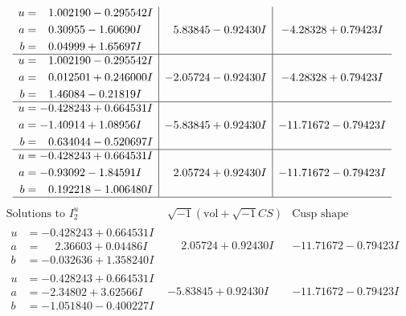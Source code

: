 \documentclass[1p]{elsarticle_modified}
\theoremstyle{definition}
\newcommand{\I}{\sqrt{-1}}
\begin{document}
$$\begin{array}{c|c|c}
\begin{aligned}
u &= \phantom{-}1.002190 - 0.295542 I \\
a &= \phantom{-}0.30955 - 1.60690 I \\
b &= \phantom{-}0.04999 + 1.65697 I\end{aligned}
 & \phantom{-}5.83845 - 0.92430 I & -4.28328 + 0.79423 I \\ \hline\begin{aligned}
u &= \phantom{-}1.002190 - 0.295542 I \\
a &= \phantom{-}0.012501 + 0.246000 I \\
b &= \phantom{-}1.46084 - 0.21819 I\end{aligned}
 & -2.05724 - 0.92430 I & -4.28328 + 0.79423 I \\ \hline\begin{aligned}
u &= -0.428243 + 0.664531 I \\
a &= -1.40914 + 1.08956 I \\
b &= \phantom{-}0.634044 - 0.520697 I\end{aligned}
 & -5.83845 + 0.92430 I & -11.71672 - 0.79423 I \\ \hline\begin{aligned}
u &= -0.428243 + 0.664531 I \\
a &= -0.93092 - 1.84591 I \\
b &= \phantom{-}0.192218 - 1.006480 I\end{aligned}
 & \phantom{-}2.05724 + 0.92430 I & -11.71672 - 0.79423 I\\
 \hline 
 \end{array}$$\newpage$$\begin{array}{c|c|c}  
\text{Solutions to }I^u_{2}& \I (\text{vol} + \sqrt{-1}CS) & \text{Cusp shape}\\
 \hline 
\begin{aligned}
u &= -0.428243 + 0.664531 I \\
a &= \phantom{-}2.36603 + 0.04486 I \\
b &= -0.032636 + 1.358240 I\end{aligned}
 & \phantom{-}2.05724 + 0.92430 I & -11.71672 - 0.79423 I \\ \hline\begin{aligned}
u &= -0.428243 + 0.664531 I \\
a &= -2.34802 + 3.62566 I \\
b &= -1.051840 - 0.400227 I\end{aligned}
 & -5.83845 + 0.92430 I & -11.71672 - 0.79423 I \\ \hline\begin{aligned}

\end{aligned}
\end{array}$$
\end{document}
